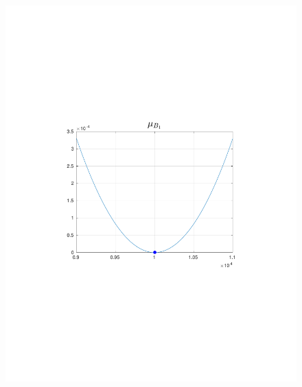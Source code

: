 \documentclass{beamer}
\begin{document}
\begin{frame}
\begin{columns}[t]
\begin{figure}
            \includegraphics[trim=4cm 4cm 4cm 8cm, clip=true, width=\linewidth]{img/FrictionApproxComp}
        \end{figure}
    \end{columns}
\end{frame}
\end{document}
